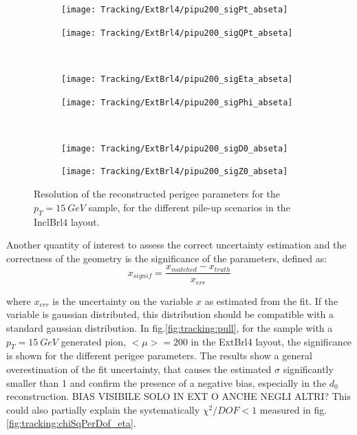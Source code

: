 \documentclass[a4paper,twoside,12pt]{article}
\begin{document}
\begin{figure}
\begin{subfigure}{.5\linewidth}
\texttt{[image: Tracking/ExtBrl4/pipu200\_sigPt\_abseta]}
\caption{}
\label{fig:tracking:pi15_sigPt_abseta_InclBrl4}
\end{subfigure}
\begin{subfigure}{.5\linewidth}
\texttt{[image: Tracking/ExtBrl4/pipu200\_sigQPt\_abseta]}
\caption{}
\label{fig:tracking:pi15_sigQPt_abseta_InclBrl4}
\end{subfigure}\\[1ex]
\begin{subfigure}{.5\linewidth}
\texttt{[image: Tracking/ExtBrl4/pipu200\_sigEta\_abseta]}
\caption{}
\label{fig:tracking:pi15_sigEta_abseta_InclBrl4}
\end{subfigure}
\begin{subfigure}{.5\linewidth}
\texttt{[image: Tracking/ExtBrl4/pipu200\_sigPhi\_abseta]}
\caption{}
\label{fig:tracking:pi15_sigPhi_abseta_InclBrl4}
\end{subfigure}\\[1ex]
\begin{subfigure}{.5\linewidth}
\texttt{[image: Tracking/ExtBrl4/pipu200\_sigD0\_abseta]}
\caption{}
\label{fig:tracking:pi15_sigD0_abseta_InclBrl4}
\end{subfigure}
\begin{subfigure}{.5\linewidth}
\texttt{[image: Tracking/ExtBrl4/pipu200\_sigZ0\_abseta]}
\caption{}
\label{fig:tracking:pi15_sigZ0_abseta_InclBrl4}
\end{subfigure}
\caption{Resolution of the reconstructed perigee parameters for the $p_{T} = 15\ GeV$ sample, for the different pile-up scenarios in the InclBrl4 layout.}
\label{fig:tracking:resolutionPileup_InclBrl4}
\end{figure}

Another quantity of interest to assess the correct uncertainty estimation and the correctness of the geometry is the significance of the parameters, defined as:
$$
x_{signif} = \frac{x_{matched} - x_{truth}}{x_{err}}
$$

where $x_{err}$ is the uncertainty on the variable $x$ as estimated from the fit. If the variable is gaussian distributed, this distribution should be compatible with
a standard gaussian distribution. In fig.\ref{fig:tracking:pull}, for the sample with a $p_{T} = 15\ GeV$ generated pion, $<\mu> = 200$ in the ExtBrl4 layout, the significance is shown for the different
perigee parameters. The results show a general overestimation of the fit uncertainty, that causes the estimated $\sigma$ significantly smaller than 1 and confirm the presence of 
a negative bias, especially in the $d_{0}$ reconstruction. BIAS VISIBILE SOLO IN EXT O ANCHE NEGLI ALTRI? This could also partially explain the systematically $\chi^2/DOF < 1$ measured in
fig.\ref{fig:tracking:chiSqPerDof_eta}.\\
\end{document}
